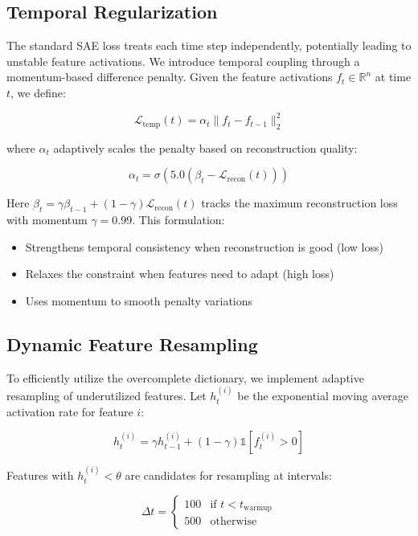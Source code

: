 \documentclass{article} %
\begin{document}
\subsection{Temporal Regularization}
The standard SAE loss treats each time step independently, potentially leading to unstable feature activations. We introduce temporal coupling through a momentum-based difference penalty. Given the feature activations $f_t \in \mathbb{R}^n$ at time $t$, we define:

\begin{equation}
    \mathcal{L}_{\text{temp}}(t) = \alpha_t\|f_t - f_{t-1}\|_2^2
\end{equation}

where $\alpha_t$ adaptively scales the penalty based on reconstruction quality:

\begin{equation}
    \alpha_t = \sigma\left(5.0\left(\beta_t - \mathcal{L}_{\text{recon}}(t)\right)\right)
\end{equation}

Here $\beta_t = \gamma\beta_{t-1} + (1-\gamma)\mathcal{L}_{\text{recon}}(t)$ tracks the maximum reconstruction loss with momentum $\gamma=0.99$. This formulation:
\begin{itemize}
    \item Strengthens temporal consistency when reconstruction is good (low loss)
    \item Relaxes the constraint when features need to adapt (high loss)
    \item Uses momentum to smooth penalty variations
\end{itemize}

\subsection{Dynamic Feature Resampling}
To efficiently utilize the overcomplete dictionary, we implement adaptive resampling of underutilized features. Let $h_t^{(i)}$ be the exponential moving average activation rate for feature $i$:

\begin{equation}
    h_t^{(i)} = \gamma h_{t-1}^{(i)} + (1-\gamma)\mathbb{1}[f_t^{(i)} > 0]
\end{equation}

Features with $h_t^{(i)} < \theta$ are candidates for resampling at intervals:

\begin{equation}
    \Delta t = \begin{cases}
        100 & \text{if } t < t_{\text{warmup}} \\
        500 & \text{otherwise}
    \end{cases}
\end{equation}
\end{document}

